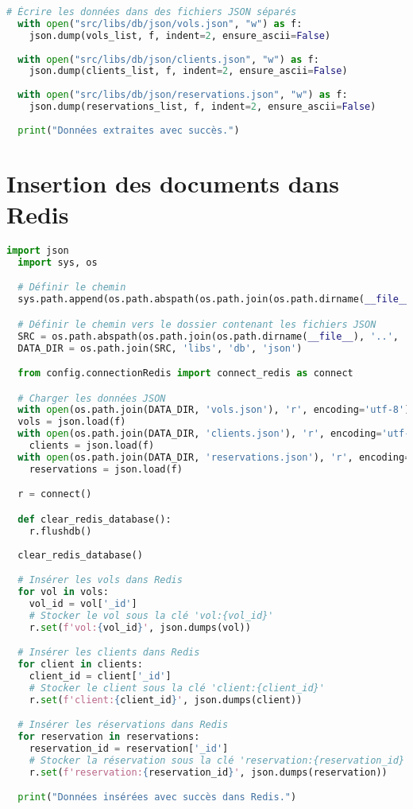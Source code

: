 \begin{lstlisting}[language=Python, caption=Script de création des documents JSON, label=lst:code_json]
  # Écrire les données dans des fichiers JSON séparés
  with open("src/libs/db/json/vols.json", "w") as f:
    json.dump(vols_list, f, indent=2, ensure_ascii=False)
  
  with open("src/libs/db/json/clients.json", "w") as f:
    json.dump(clients_list, f, indent=2, ensure_ascii=False)
  
  with open("src/libs/db/json/reservations.json", "w") as f:
    json.dump(reservations_list, f, indent=2, ensure_ascii=False)
  
  print("Données extraites avec succès.")
\end{lstlisting}

\section{Insertion des documents dans Redis}
\label{ann:redis_insert}
\begin{lstlisting}[language=Python, caption=Script d'insertion des documents dans Redis, label=lst:redis_insert]
  import json
  import sys, os

  # Définir le chemin 
  sys.path.append(os.path.abspath(os.path.join(os.path.dirname(__file__), '..', '..')))

  # Définir le chemin vers le dossier contenant les fichiers JSON
  SRC = os.path.abspath(os.path.join(os.path.dirname(__file__), '..', '..'))
  DATA_DIR = os.path.join(SRC, 'libs', 'db', 'json')

  from config.connectionRedis import connect_redis as connect

  # Charger les données JSON
  with open(os.path.join(DATA_DIR, 'vols.json'), 'r', encoding='utf-8') as f: 
  vols = json.load(f)
  with open(os.path.join(DATA_DIR, 'clients.json'), 'r', encoding='utf-8') as f:
    clients = json.load(f)
  with open(os.path.join(DATA_DIR, 'reservations.json'), 'r', encoding='utf-8') as f:
    reservations = json.load(f)

  r = connect()

  def clear_redis_database():
    r.flushdb()
    
  clear_redis_database()

  # Insérer les vols dans Redis
  for vol in vols:
    vol_id = vol['_id']
    # Stocker le vol sous la clé 'vol:{vol_id}'
    r.set(f'vol:{vol_id}', json.dumps(vol))

  # Insérer les clients dans Redis
  for client in clients:
    client_id = client['_id']
    # Stocker le client sous la clé 'client:{client_id}'
    r.set(f'client:{client_id}', json.dumps(client))

  # Insérer les réservations dans Redis
  for reservation in reservations:
    reservation_id = reservation['_id']
    # Stocker la réservation sous la clé 'reservation:{reservation_id}'
    r.set(f'reservation:{reservation_id}', json.dumps(reservation))

  print("Données insérées avec succès dans Redis.")
\end{lstlisting}

